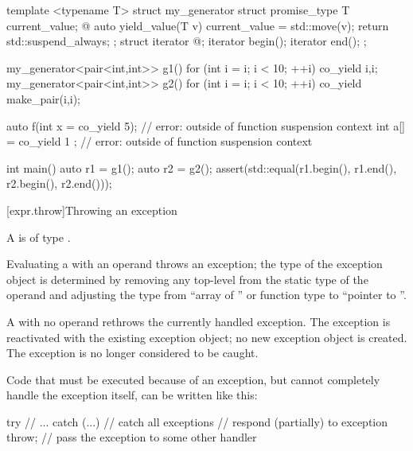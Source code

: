 \begin{example}
\begin{codeblock}
template <typename T>
struct my_generator {
  struct promise_type {
    T current_value;
    @\commentellip@
    auto yield_value(T v) {
      current_value = std::move(v);
      return std::suspend_always{};
    }
  };
  struct iterator { @\commentellip@ };
  iterator begin();
  iterator end();
};

my_generator<pair<int,int>> g1() {
  for (int i = i; i < 10; ++i) co_yield {i,i};
}
my_generator<pair<int,int>> g2() {
  for (int i = i; i < 10; ++i) co_yield make_pair(i,i);
}

auto f(int x = co_yield 5);     // error:  outside of function suspension context
int a[] = { co_yield 1 };       // error:  outside of function suspension context

int main() {
  auto r1 = g1();
  auto r2 = g2();
  assert(std::equal(r1.begin(), r1.end(), r2.begin(), r2.end()));
}
\end{codeblock}
\end{example}

[expr.throw]{Throwing an exception}%
%
%
%
%
\begin{bnf}
\br
      
\end{bnf}

\pnum
A  is of type .

\pnum
Evaluating a  with an operand throws an
exception; the type of the exception object is determined by removing
any top-level  from the static type of the
operand and adjusting the type
from ``array of '' or function type 
to ``pointer to ''.

\pnum
{}%
A
with no operand rethrows the currently handled exception.
The exception is reactivated with the existing exception object;
no new exception object is created.
The exception is no longer considered to be caught.
\begin{example}
Code that must be executed because of an exception, but cannot
completely handle the exception itself, can be written like this:
\begin{codeblock}
try {
  // ...
} catch (...) {     // catch all exceptions
  // respond (partially) to exception
  throw;            // pass the exception to some other handler
}
\end{codeblock}
\end{example}


